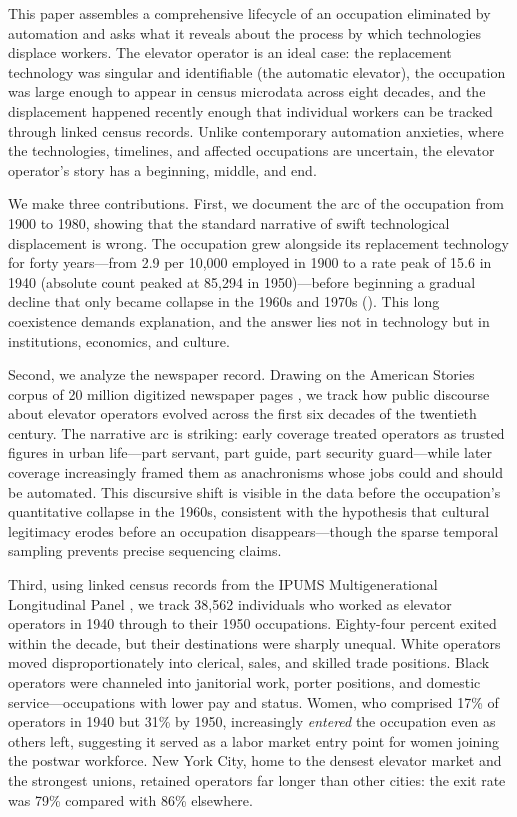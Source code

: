 \documentclass[12pt]{article}
\begin{document}
This paper assembles a comprehensive lifecycle of an occupation eliminated by automation and asks what it reveals about the process by which technologies displace workers. The elevator operator is an ideal case: the replacement technology was singular and identifiable (the automatic elevator), the occupation was large enough to appear in census microdata across eight decades, and the displacement happened recently enough that individual workers can be tracked through linked census records. Unlike contemporary automation anxieties, where the technologies, timelines, and affected occupations are uncertain, the elevator operator's story has a beginning, middle, and end.

We make three contributions. First, we document the arc of the occupation from 1900 to 1980, showing that the standard narrative of swift technological displacement is wrong. The occupation grew alongside its replacement technology for forty years---from 2.9 per 10,000 employed in 1900 to a rate peak of 15.6 in 1940 (absolute count peaked at 85,294 in 1950)---before beginning a gradual decline that only became collapse in the 1960s and 1970s (). This long coexistence demands explanation, and the answer lies not in technology but in institutions, economics, and culture.

Second, we analyze the newspaper record. Drawing on the American Stories corpus of 20 million digitized newspaper pages \citep{dell2023}, we track how public discourse about elevator operators evolved across the first six decades of the twentieth century. The narrative arc is striking: early coverage treated operators as trusted figures in urban life---part servant, part guide, part security guard---while later coverage increasingly framed them as anachronisms whose jobs could and should be automated. This discursive shift is visible in the data before the occupation's quantitative collapse in the 1960s, consistent with the hypothesis that cultural legitimacy erodes before an occupation disappears---though the sparse temporal sampling prevents precise sequencing claims.

Third, using linked census records from the IPUMS Multigenerational Longitudinal Panel \citep{ruggles2024}, we track 38,562 individuals who worked as elevator operators in 1940 through to their 1950 occupations. Eighty-four percent exited within the decade, but their destinations were sharply unequal. White operators moved disproportionately into clerical, sales, and skilled trade positions. Black operators were channeled into janitorial work, porter positions, and domestic service---occupations with lower pay and status. Women, who comprised 17\% of operators in 1940 but 31\% by 1950, increasingly \emph{entered} the occupation even as others left, suggesting it served as a labor market entry point for women joining the postwar workforce. New York City, home to the densest elevator market and the strongest unions, retained operators far longer than other cities: the exit rate was 79\% compared with 86\% elsewhere.
\end{document}
